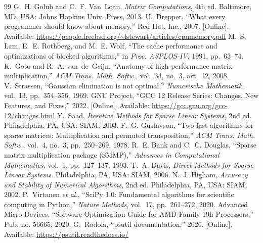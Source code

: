 \documentclass[11pt,a4paper]{article}
\begin{document}
\begin{thebibliography}{99}\small\sloppy
\setlength{\itemsep}{1pt}
 G.~H. Golub and C.~F. Van~Loan, \emph{Matrix Computations}, 4th ed. Baltimore, MD, USA: Johns Hopkins Univ. Press, 2013.
 U.~Drepper, ``What every programmer should know about memory,'' Red Hat, Inc., 2007. [Online]. Available: \url{https://people.freebsd.org/~lstewart/articles/cpumemory.pdf}
 M.~S. Lam, E.~E. Rothberg, and M.~E. Wolf, ``The cache performance and optimizations of blocked algorithms,'' in \emph{Proc. ASPLOS-IV}, 1991, pp.~63--74.
 K.~Goto and R.~A. van~de~Geijn, ``Anatomy of high-performance matrix multiplication,'' \emph{ACM Trans. Math. Softw.}, vol.~34, no.~3, art.~12, 2008.
 V.~Strassen, ``Gaussian elimination is not optimal,'' \emph{Numerische Mathematik}, vol.~13, pp.~354--356, 1969.
 GNU Project, ``GCC 12 Release Series: Changes, New Features, and Fixes,'' 2022. [Online]. Available: \url{https://gcc.gnu.org/gcc-12/changes.html}
 Y.~Saad, \emph{Iterative Methods for Sparse Linear Systems}, 2nd ed. Philadelphia, PA, USA: SIAM, 2003.
 F.~G. Gustavson, ``Two fast algorithms for sparse matrices: Multiplication and permuted transposition,'' \emph{ACM Trans. Math. Softw.}, vol.~4, no.~3, pp.~250--269, 1978.
 R.~E. Bank and C.~C. Douglas, ``Sparse matrix multiplication package (SMMP),'' \emph{Advances in Computational Mathematics}, vol.~1, pp.~127--137, 1993.
 T.~A. Davis, \emph{Direct Methods for Sparse Linear Systems}. Philadelphia, PA, USA: SIAM, 2006.
 N.~J. Higham, \emph{Accuracy and Stability of Numerical Algorithms}, 2nd ed. Philadelphia, PA, USA: SIAM, 2002.
 P.~Virtanen \emph{et al.}, ``SciPy 1.0: Fundamental algorithms for scientific computing in Python,'' \emph{Nature Methods}, vol.~17, pp.~261--272, 2020.
 Advanced Micro Devices, ``Software Optimization Guide for AMD Family 19h Processors,'' Pub. no. 56665, 2020.
 G.~Rodola, ``psutil documentation,'' 2026. [Online]. Available: \url{https://psutil.readthedocs.io/}
\end{thebibliography}
\end{document}
